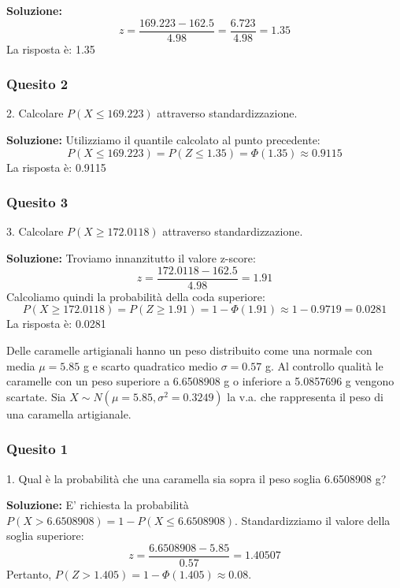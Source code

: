 \documentclass[12pt, a4paper]{article}
\begin{document}
\textbf{Soluzione:}
$$ z = \frac{169.223 - 162.5}{4.98} = \frac{6.723}{4.98} = 1.35 $$
La risposta è: 1.35

\subsubsection*{Quesito 2}
2. Calcolare $P(X \leq 169.223)$ attraverso standardizzazione.

\textbf{Soluzione:}
Utilizziamo il quantile calcolato al punto precedente:
$$ P(X \leq 169.223) = P(Z \leq 1.35) = \Phi(1.35) \approx 0.9115 $$
La risposta è: 0.9115

\subsubsection*{Quesito 3}
3. Calcolare $P(X \geq 172.0118)$ attraverso standardizzazione.

\textbf{Soluzione:}
Troviamo innanzitutto il valore z-score:
$$ z = \frac{172.0118 - 162.5}{4.98} = 1.91 $$
Calcoliamo quindi la probabilità della coda superiore:
$$ P(X \geq 172.0118) = P(Z \geq 1.91) = 1 - \Phi(1.91) \approx 1 - 0.9719 = 0.0281 $$
La risposta è: 0.0281


\vspace{0.5cm}
\begin{tcolorbox}[colback=lightergray!10, colframe=tocsec, title=\textbf{Esercizio 11}]
Delle caramelle artigianali hanno un peso distribuito come una normale con media $\mu=5.85$ g e scarto quadratico medio $\sigma=0.57$ g. Al controllo qualità le caramelle con un peso superiore a 6.6508908 g o inferiore a 5.0857696 g vengono scartate.
Sia $X \sim N(\mu=5.85, \sigma^2=0.3249)$ la v.a. che rappresenta il peso di una caramella artigianale.
\end{tcolorbox}

\subsubsection*{Quesito 1}
1. Qual è la probabilità che una caramella sia sopra il peso soglia 6.6508908 g?

\textbf{Soluzione:}
E’ richiesta la probabilità $P(X > 6.6508908) = 1 - P(X \leq 6.6508908)$.
Standardizziamo il valore della soglia superiore:
$$ z = \frac{6.6508908 - 5.85}{0.57} = 1.40507 $$
Pertanto, $P(Z > 1.405) = 1 - \Phi(1.405) \approx 0.08$.
\end{document}
